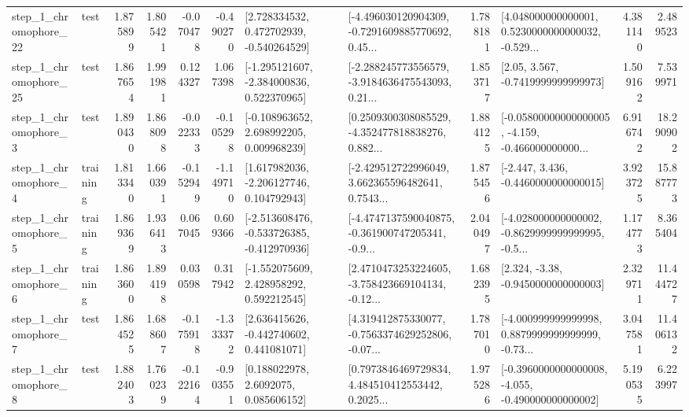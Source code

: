 \begin{tabular}{llrrrrllrlrr}
    step\_1\_chromophore\_22 &      test &      1.875899 &    1.805421 &     -0.070478 & -0.490270 &    [2.728334532, 0.472702939, -0.540264529] &  [-4.496030120904309, -0.7291609885770692, 0.45... &       1.788181 &  [4.048000000000001, 0.5230000000000032, -0.529... &            4.381140 &          2.489523 \\
    step\_1\_chromophore\_25 &      test &      1.867654 &    1.991981 &      0.124327 &  1.067398 &   [-1.295121607, -2.384000836, 0.522370965] &  [-2.288245773556579, -3.9184636475543093, 0.21... &       1.853717 &                 [2.05, 3.567, -0.7419999999999973] &            1.509162 &          7.539971 \\
     step\_1\_chromophore\_3 &      test &      1.890430 &    1.868098 &     -0.022333 & -0.105298 &    [-0.108963652, 2.698992205, 0.009968239] &  [0.2509300308085529, -4.352477818838276, 0.882... &       1.884125 &  [-0.05800000000000005, -4.159, -0.466000000000... &            6.916742 &         18.290902 \\
     step\_1\_chromophore\_4 &  training &      1.813340 &    1.660391 &     -0.152949 & -1.149710 &    [1.617982036, -2.206127746, 0.104792943] &  [-2.429512722996049, 3.662365596482641, 0.7543... &       1.875456 &               [-2.447, 3.436, -0.4460000000000015] &            3.923725 &         15.887773 \\
     step\_1\_chromophore\_5 &  training &      1.869369 &    1.936413 &      0.067045 &  0.609366 &  [-2.513608476, -0.533726385, -0.412970936] &  [-4.4747137590040875, -0.361900747205341, -0.9... &       2.040497 &  [-4.028000000000002, -0.8629999999999995, -0.5... &            1.174773 &          8.365404 \\
     step\_1\_chromophore\_6 &  training &      1.863600 &    1.894198 &      0.030598 &  0.317942 &    [-1.552075609, 2.428958292, 0.592212545] &  [2.4710473253224605, -3.758423669104134, -0.12... &       1.682395 &                [2.324, -3.38, -0.9450000000000003] &            2.329711 &         11.444727 \\
     step\_1\_chromophore\_7 &      test &      1.864525 &    1.688607 &     -0.175918 & -1.333372 &    [2.636415626, -0.442740602, 0.441081071] &  [4.319412875330077, -0.7563374629252806, -0.07... &       1.787010 &  [-4.000999999999998, 0.8879999999999999, -0.73... &            3.047581 &         11.406132 \\
     step\_1\_chromophore\_8 &      test &      1.882403 &    1.760239 &     -0.122164 & -0.903551 &       [0.188022978, 2.6092075, 0.085606152] &  [0.7973846469729834, 4.484510412553442, 0.2025... &       1.975286 &  [-0.3960000000000008, -4.055, -0.490000000000002] &            5.190535 &          6.223997 \\

\end{tabular}
